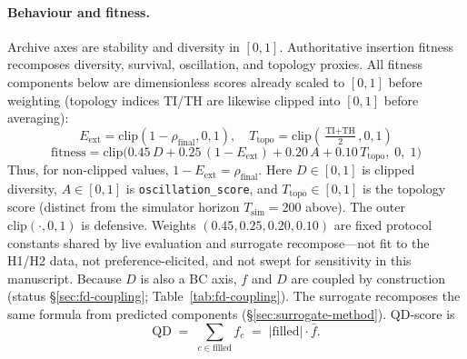 \documentclass[preprint,12pt]{elsarticle}
\begin{document}
\paragraph{Behaviour and fitness.}
Archive axes are stability and diversity in $[0,1]$. Authoritative insertion fitness recomposes diversity, survival, oscillation, and topology proxies. All fitness components below are dimensionless scores already scaled to $[0,1]$ before weighting (topology indices TI/TH are likewise clipped into $[0,1]$ before averaging):
\begin{equation}
  E_{\mathrm{ext}} = \mathrm{clip}(1 - \rho_{\mathrm{final}}, 0, 1), \quad
  T_{\mathrm{topo}} = \mathrm{clip}\!\left(\tfrac{\text{TI} + \text{TH}}{2}, 0, 1\right)
\end{equation}
\begin{equation}
  \label{eq:fitness}
  \text{fitness} = \mathrm{clip}\bigl(
    0.45\,D + 0.25\,(1 - E_{\mathrm{ext}}) + 0.20\,A + 0.10\,T_{\mathrm{topo}}
  ,\; 0,\; 1\bigr)
\end{equation}
Thus, for non-clipped values, $1-E_{\mathrm{ext}}=\rho_{\mathrm{final}}$.
Here $D\in[0,1]$ is clipped diversity, $A\in[0,1]$ is \texttt{oscillation\_score}, and $T_{\mathrm{topo}}\in[0,1]$ is the topology score (distinct from the simulator horizon $T_{\mathrm{sim}}{=}200$ above). The outer $\mathrm{clip}(\cdot,0,1)$ is defensive. Weights $(0.45,0.25,0.20,0.10)$ are fixed protocol constants shared by live evaluation and surrogate recompose---not fit to the H1/H2 data, not preference-elicited, and not swept for sensitivity in this manuscript. Because $D$ is also a BC axis, $f$ and $D$ are coupled by construction (status \S\ref{sec:fd-coupling}; Table~\ref{tab:fd-coupling}). The surrogate recomposes the same formula from predicted components (\S\ref{sec:surrogate-method}). QD-score is
\begin{equation}
  \mathrm{QD} \;=\; \sum_{c \in \mathrm{filled}} f_c \;=\; |\mathrm{filled}| \cdot \bar f.
  \label{eq:qd}
\end{equation}
\end{document}
